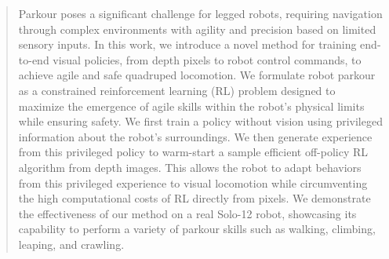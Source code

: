\begin{abstract}
Parkour poses a significant challenge for legged robots, requiring navigation through complex environments with agility and precision based on limited sensory inputs.
In this work,  we introduce a novel method for training end-to-end visual policies, from depth pixels to robot control commands, to achieve agile and safe quadruped locomotion.
We formulate robot parkour as a constrained reinforcement learning (RL) problem designed to maximize the emergence of agile skills within the robot's physical limits while ensuring safety. 
We first train a policy without vision using privileged information about the robot's surroundings. 
We then generate experience from this privileged policy to warm-start a sample efficient off-policy RL algorithm from depth images.
This allows the robot to adapt behaviors from this privileged experience to visual locomotion while circumventing the high computational costs of RL directly from pixels.
We demonstrate the effectiveness of our method on a real Solo-12 robot, showcasing its capability to perform a variety of parkour skills such as walking, climbing, leaping, and crawling.
\end{abstract}